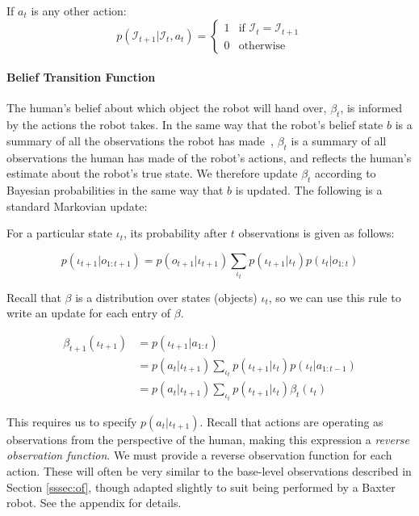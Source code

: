 \documentclass{article}
\newcommand{\Iota}{\mathcal{I}}
\begin{document}
\begin{multicols}{2}
If $a_t$ is any other action: 
\begin{equation*}
	p(\Iota_{t+1} | \Iota_t, a_t) = \begin{cases}
		1 & \text{if $\Iota_{t} = \Iota_{t+1}$} \\ 
		0 & \text{otherwise}
	\end{cases}
\end{equation*}

\paragraph{Belief Transition Function}

The human's belief about which object the robot will hand over, $\beta_t$, is informed by the actions the robot takes. In the same way that the robot's belief state $b$ is a summary of all the observations the robot has made~\citep{kaelbling99}, $\beta_t$ is a summary of all observations the human has made of the robot's actions, and reflects the human's estimate about the robot's true state. We therefore update $\beta_t$ according to Bayesian probabilities in the same way that $b$ is updated. The following is a standard Markovian update: 

For a particular state $\iota_t$, its probability after $t$ observations is given as follows: 

\begin{equation*}
	p(\iota_{t+1} | o_{1:t+1}) = p(o_{t+1} | \iota_{t+1}) \sum_{\iota_{t}} p(\iota_{t+1} | \iota_{t}) p (\iota_{t} | o_{1:t})
\end{equation*}

Recall that $\beta$ is a distribution over states (objects) $\iota_t$, so we can use this rule to write an update for each entry of $\beta$. 

\begin{align*}
	\beta_{t+1}(\iota_{t+1})&= p(\iota_{t+1} | a_{1:t})  \\
	&= p(a_{t} | \iota_{t+1}) \sum_{\iota_{t}} p(\iota_{t+1} | \iota_{t}) p (\iota_{t} | a_{1:t-1}) \\ 
	&= p(a_{t} | \iota_{t+1}) \sum_{\iota_{t}} p(\iota_{t+1} | \iota_{t}) \beta_{t}(\iota_{t}) 
\end{align*}

This requires us to specify $p(a_{t} | \iota_{t+1})$. Recall that actions are operating as observations from the perspective of the human, making this expression a \emph{reverse observation function}. We must provide a reverse observation function for each action. These will often be very similar to the base-level observations described in Section \ref{sssec:of}, though adapted slightly to suit being performed by a Baxter robot. See the appendix for details. 


\end{multicols}
\end{document}
